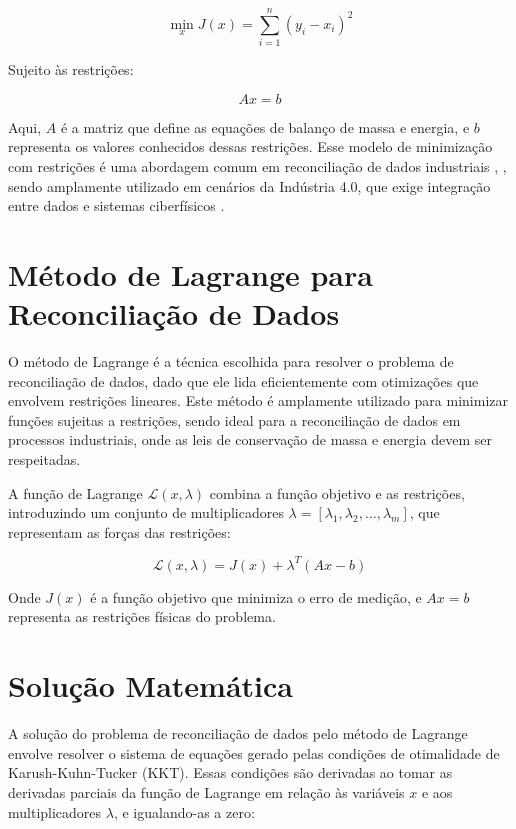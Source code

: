 \begin{equation}
\min_x J(x) = \sum_{i=1}^{n} (y_i - x_i)^2
\end{equation}

Sujeito às restrições:

\begin{equation}
Ax = b
\end{equation}

Aqui, $A$ é a matriz que define as equações de balanço de massa e energia, e $b$ representa os valores conhecidos dessas restrições. Esse modelo de minimização com restrições é uma abordagem comum em reconciliação de dados industriais \cite{lagrangeopt}, \cite{processbalancing}, sendo amplamente utilizado em cenários da Indústria 4.0, que exige integração entre dados e sistemas ciberfísicos \cite{cyberphysicalsystems}.

\section{Método de Lagrange para Reconciliação de Dados}
\label{Sec:MetodoLagrange}

O método de Lagrange é a técnica escolhida para resolver o problema de reconciliação de dados, dado que ele lida eficientemente com otimizações que envolvem restrições lineares. Este método é amplamente utilizado para minimizar funções sujeitas a restrições, sendo ideal para a reconciliação de dados em processos industriais, onde as leis de conservação de massa e energia devem ser respeitadas.

A função de Lagrange $\mathcal{L}(x, \lambda)$ combina a função objetivo e as restrições, introduzindo um conjunto de multiplicadores $\lambda = [\lambda_1, \lambda_2, \dots, \lambda_m]$, que representam as forças das restrições:

\[
\mathcal{L}(x, \lambda) = J(x) + \lambda^T (Ax - b)
\]

Onde $J(x)$ é a função objetivo que minimiza o erro de medição, e $Ax = b$ representa as restrições físicas do problema.

\section{Solução Matemática}
\label{Sec:SolucaoMatematica}

A solução do problema de reconciliação de dados pelo método de Lagrange envolve resolver o sistema de equações gerado pelas condições de otimalidade de Karush-Kuhn-Tucker (KKT). Essas condições são derivadas ao tomar as derivadas parciais da função de Lagrange em relação às variáveis $x$ e aos multiplicadores $\lambda$, e igualando-as a zero:

